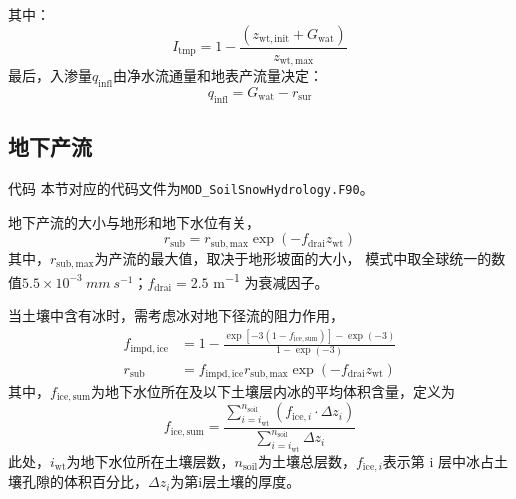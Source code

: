 其中：
\begin{equation}
{I}_{\mathrm{tmp}} = 1 - \frac{\left( z_{\mathrm{wt,init}} + {G}_{\mathrm{wat}} \right)}{z_{\mathrm{wt,max}}}
\end{equation}
最后，入渗量$q_{\mathrm{infl}}$由净水流通量和地表产流量决定：
\begin{equation}
  q_{\mathrm{infl}}={G}_{\mathrm{wat}}-r_{\mathrm{sur}}
\end{equation}






\subsection{地下产流} \label{section:rsub_par}
\begin{mymdframed}{代码}
  本节对应的代码文件为\texttt{MOD\_SoilSnowHydrology.F90}。
\end{mymdframed}

地下产流的大小与地形和地下水位有关\citep{niu2005simple}，
\begin{equation}
  r_{\mathrm{sub}} = r_{\mathrm{sub,max}} \exp \left(-f_{\mathrm{drai}}  z_{\mathrm{wt}}\right)
\end{equation}
其中，$r_{\mathrm{sub,max}}$为产流的最大值，取决于地形坡面的大小，
模式中取全球统一的数值$5.5\times 10^{-3}~\unit{mm~s^{-1}}$；$f_{\mathrm{drai}}=2.5$ \unit{m^{-1}} 为衰减因子。

当土壤中含有冰时，需考虑冰对地下径流的阻力作用，
\begin{equation}
  \begin{aligned}
    f_{\mathrm{impd,ice}} & = 1 - \frac{\exp \left[-3 \left(1-f_{\mathrm{ice,sum}}\right)\right]
    -\exp (-3)}{1-\exp (-3)} \\
    r_{\mathrm{sub}} & = f_{\mathrm{impd,ice}}  r_{\mathrm{sub,max}}
    \exp \left(-f_{\mathrm{drai}}  z_{\mathrm{wt}}\right)
  \end{aligned}
\end{equation}
其中，$f_{\mathrm{ice,sum}}$为地下水位所在及以下土壤层内冰的平均体积含量，定义为
\begin{equation}
    f_{\mathrm{ice,sum}} = \frac{\sum_{i=i_{\mathrm{wt}}}^{n_{\mathrm{soil}}} \left(f_{\mathrm{ice},i}\cdot \Delta z_i\right)}{\sum_{i=i_{\mathrm{wt}}}^{n_{\mathrm{soil}}} \Delta z_i}
\end{equation}
此处，$i_{\mathrm{wt}}$为地下水位所在土壤层数，$n_{\mathrm{soil}}$为土壤总层数，$f_{\mathrm{ice},i}$表示第 i 层中冰占土壤孔隙的体积百分比，$\Delta z_i$为第i层土壤的厚度。

